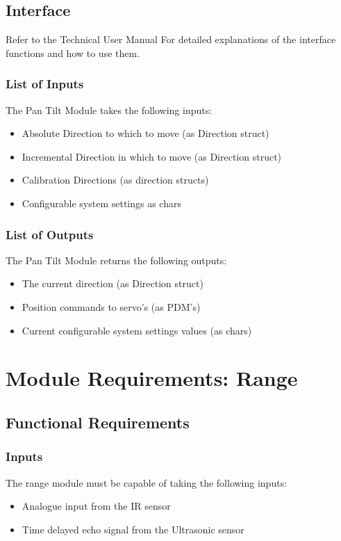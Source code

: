 \documentclass[]{report}
\begin{document}
\subsection{Interface}
Refer to the Technical User Manual For detailed explanations of the interface functions and how to use them.

\subsubsection{List of Inputs}
The Pan Tilt Module takes the following inputs:
\begin{itemize}
	\item Absolute Direction to which to move (as Direction struct)
	\item Incremental Direction in which to move (as Direction struct)
	\item Calibration Directions (as direction structs)
	\item Configurable system settings as chars
\end{itemize}

\subsubsection{List of Outputs}
The Pan Tilt Module returns the following outputs:
\begin{itemize}
	\item The current direction (as Direction struct)
	\item Position commands to servo's (as PDM's)
	\item Current configurable system settings values (as chars)
\end{itemize}

\section{Module Requirements: Range}
\subsection{Functional Requirements}
\subsubsection{Inputs}
The range module must be capable of taking the following inputs:
\begin{itemize}
	\item Analogue input from the IR sensor
	\item Time delayed echo signal from the Ultrasonic sensor
\end{itemize}
\end{document}
